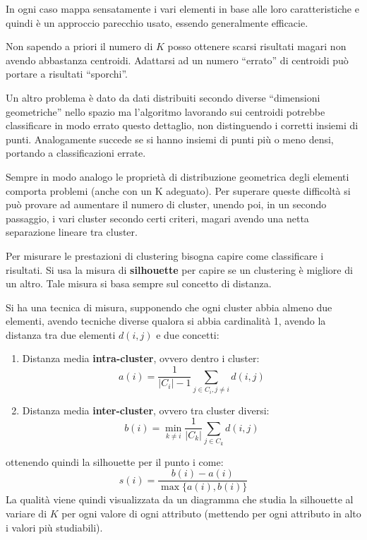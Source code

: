 In ogni caso mappa sensatamente i vari elementi in base alle loro caratteristiche
e quindi è un approccio parecchio usato, essendo generalmente efficacie.

Non sapendo a priori il numero di $K$ posso ottenere scarsi risultati magari non
avendo abbastanza centroidi. Adattarsi ad un numero “errato” di centroidi può
portare a risultati “sporchi”.

Un altro problema è dato da dati distribuiti secondo diverse “dimensioni geometriche”
nello spazio ma l'algoritmo lavorando sui centroidi potrebbe classificare in modo
errato questo dettaglio, non distinguendo i corretti insiemi di punti. Analogamente
succede se si hanno insiemi di punti più o meno densi, portando a classificazioni errate.

Sempre in modo analogo le proprietà di distribuzione geometrica degli elementi
comporta problemi (anche con un K adeguato). Per superare queste difficoltà si
può provare ad aumentare il numero di cluster, unendo poi, in un secondo passaggio,
i vari cluster secondo certi criteri, magari avendo una netta separazione lineare
tra cluster.

Per misurare le prestazioni di clustering bisogna capire come classificare i
risultati. Si usa la misura di \textbf{silhouette} per capire se un clustering è
migliore di un altro. Tale misura si basa sempre sul concetto di distanza.

Si ha una tecnica di misura, supponendo che ogni cluster abbia almeno due elementi,
avendo tecniche diverse qualora si abbia cardinalità 1, avendo la distanza tra
due elementi $d(i, j)$ e due concetti:
\begin{enumerate}
    \item Distanza media \textbf{intra-cluster}, ovvero dentro i cluster:
          \begin{equation}
              a(i) = \frac{1}{|C_i| - 1} \sum_{j \in C_i, j \neq i} d(i, j)
          \end{equation}
    \item Distanza media \textbf{inter-cluster}, ovvero tra cluster diversi:
          \begin{equation}
              b(i) = \min_{k \neq i} \frac{1}{|C_k|} \sum_{j \in C_k} d(i, j)
          \end{equation}
\end{enumerate}
ottenendo quindi la silhouette per il punto i come:
\begin{equation}
    s(i) = \frac{b(i) - a(i)}{\max\{a(i), b(i)\}}
\end{equation}
La qualità viene quindi visualizzata da un diagramma che studia la silhouette al
variare di $K$ per ogni valore di ogni attributo (mettendo per ogni attributo in
alto i valori più studiabili).

